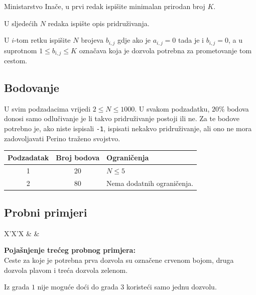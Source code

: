 \begin{statement}[
  problempoints=100,
  timelimit=1 sekunda,
  memorylimit=1024 MiB,
]{Ministarstvo}
Inače, u prvi redak ispišite minimalan prirodan broj $K$.

U sljedećih $N$ redaka ispište opis pridruživanja.

U $i$-tom retku ispišite $N$ brojeva $b_{i, j}$ gdje ako je $a_{i, j} = 0$ tada je i $b_{i, j} = 0$, a u suprotnom $1 \leq b_{i, j} \leq K$ označava koja je dozvola potrebna za prometovanje tom cestom. 

\subsection*{Bodovanje}

U svim podzadacima vrijedi $2 \leq N \leq 1000$. U svakom podzadatku, $20\%$ bodova donosi samo odlučivanje je li takvo pridruživanje postoji ili ne. Za te bodove potrebno je, ako niste ispisali \texttt{-1}, ispisati nekakvo pridruživanje, ali ono ne mora zadovoljavati Perino traženo svojstvo. 

{\renewcommand{\arraystretch}{1.4}
  \setlength{\tabcolsep}{6pt}
  \begin{tabular}{ccl}
   Podzadatak & Broj bodova & Ograničenja \\ \midrule
    1 & 20 & $N \leq 5$  \\
    2 & 80 & Nema dodatnih ograničenja. \\
\end{tabular}}

\subsection*{Probni primjeri}
\begin{tabularx}{\textwidth}{X'X'X}
 &
 &
\end{tabularx}

\textbf{Pojašnjenje trećeg probnog primjera:}\\

Ceste za koje je potrebna prva dozvola su označene crvenom bojom, druga dozvola plavom i treća dozvola zelenom. 

Iz grada $1$ nije moguće doći do grada $3$ koristeći samo jednu dozvolu.


\end{statement}
